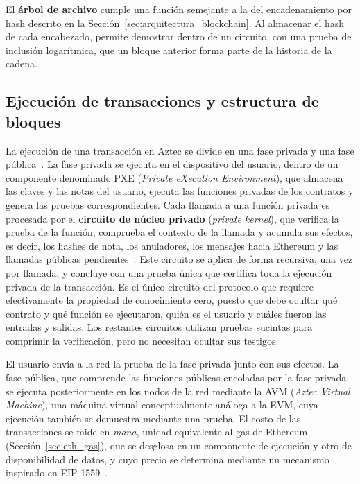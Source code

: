 El \textbf{árbol de archivo} cumple una función semejante a la del encadenamiento por hash
descrito en la Sección~\ref{sec:arquitectura_blockchain}. Al almacenar el hash de cada
encabezado, permite demostrar dentro de un circuito, con una prueba de inclusión logarítmica, que
un bloque anterior forma parte de la historia de la cadena.

\subsection{Ejecución de transacciones y estructura de bloques}
\label{sec:aztec_bloques}

La ejecución de una transacción en Aztec se divide en una fase privada y una fase
pública~\cite{aztectransactions}. La fase privada se ejecuta en el dispositivo del usuario,
dentro de un componente denominado PXE (\textit{Private eXecution Environment}), que almacena las
claves y las notas del usuario, ejecuta las funciones privadas de los contratos y genera las
pruebas correspondientes. Cada llamada a una función privada es procesada por el \textbf{circuito
de núcleo privado} (\textit{private kernel}), que verifica la prueba de la función, comprueba el
contexto de la llamada y acumula sus efectos, es decir, los hashes de nota, los anuladores, los
mensajes hacia Ethereum y las llamadas públicas pendientes~\cite{aztecprivatekernel}. Este
circuito se aplica de forma recursiva, una vez por llamada, y concluye con una prueba única que
certifica toda la ejecución privada de la transacción. Es el único circuito del protocolo que
requiere efectivamente la propiedad de conocimiento cero, puesto que debe ocultar qué contrato y
qué función se ejecutaron, quién es el usuario y cuáles fueron las entradas y salidas. Los
restantes circuitos utilizan pruebas sucintas para comprimir la verificación, pero no necesitan
ocultar sus testigos.

El usuario envía a la red la prueba de la fase privada junto con sus efectos. La fase pública,
que comprende las funciones públicas encoladas por la fase privada, se ejecuta posteriormente en
los nodos de la red mediante la AVM (\textit{Aztec Virtual Machine}), una máquina virtual
conceptualmente análoga a la EVM, cuya ejecución también se demuestra mediante una prueba. El
costo de las transacciones se mide en \textit{mana}, unidad equivalente al gas de Ethereum
(Sección~\ref{sec:eth_gas}), que se desglosa en un componente de ejecución y otro de
disponibilidad de datos, y cuyo precio se determina mediante un mecanismo inspirado en
EIP-1559~\cite{aztecfees}.

